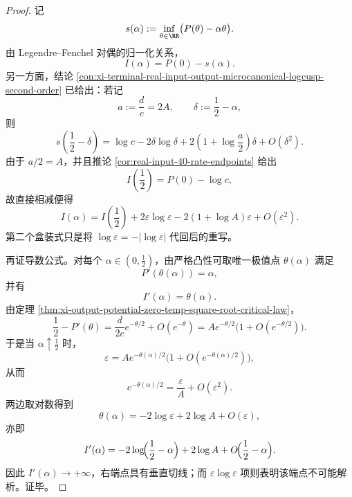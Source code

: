 \begin{proof}
记
\[
s(\alpha):=\inf_{\theta\in\RR}\bigl(P(\theta)-\alpha\theta\bigr).
\]
由 Legendre--Fenchel 对偶的归一化关系，
\[
I(\alpha)=P(0)-s(\alpha).
\]
另一方面，结论 \ref{con:xi-terminal-real-input-output-microcanonical-logcusp-second-order} 已给出：若记
\[
a:=\frac{d}{c}=2A,
\qquad
\delta:=\frac12-\alpha,
\]
则
\[
s\!\left(\frac12-\delta\right)
=
\log c-2\delta\log\delta+2\left(1+\log\frac{a}{2}\right)\delta+O(\delta^2).
\]
由于 \(a/2=A\)，并且推论 \ref{cor:real-input-40-rate-endpoints} 给出
\[
I\!\left(\frac12\right)=P(0)-\log c,
\]
故直接相减便得
\[
I(\alpha)
=
I\!\left(\frac12\right)
+2\varepsilon\log\varepsilon
-2(1+\log A)\varepsilon
+O(\varepsilon^2).
\]
第二个盒装式只是将 \(\log\varepsilon=-|\log\varepsilon|\) 代回后的重写。

再证导数公式。对每个 \(\alpha\in(0,\frac12)\)，由严格凸性可取唯一极值点 \(\theta(\alpha)\) 满足
\[
P'(\theta(\alpha))=\alpha,
\]
并有
\[
I'(\alpha)=\theta(\alpha).
\]
由定理 \ref{thm:xi-output-potential-zero-temp-square-root-critical-law}，
\[
\frac12-P'(\theta)=\frac{d}{2c}e^{-\theta/2}+O(e^{-\theta})
=
A e^{-\theta/2}\bigl(1+O(e^{-\theta/2})\bigr).
\]
于是当 \(\alpha\uparrow\frac12\) 时，
\[
\varepsilon
=
A e^{-\theta(\alpha)/2}\bigl(1+O(e^{-\theta(\alpha)/2})\bigr),
\]
从而
\[
e^{-\theta(\alpha)/2}=\frac{\varepsilon}{A}+O(\varepsilon^2).
\]
两边取对数得到
\[
\theta(\alpha)
=
-2\log\varepsilon+2\log A+O(\varepsilon),
\]
亦即
\[
I'(\alpha)
=
-2\log\!\Bigl(\frac12-\alpha\Bigr)+2\log A+O\!\Bigl(\frac12-\alpha\Bigr).
\]
因此 \(I'(\alpha)\to+\infty\)，右端点具有垂直切线；而 \(\varepsilon\log\varepsilon\) 项则表明该端点不可能解析。证毕。
\end{proof}

